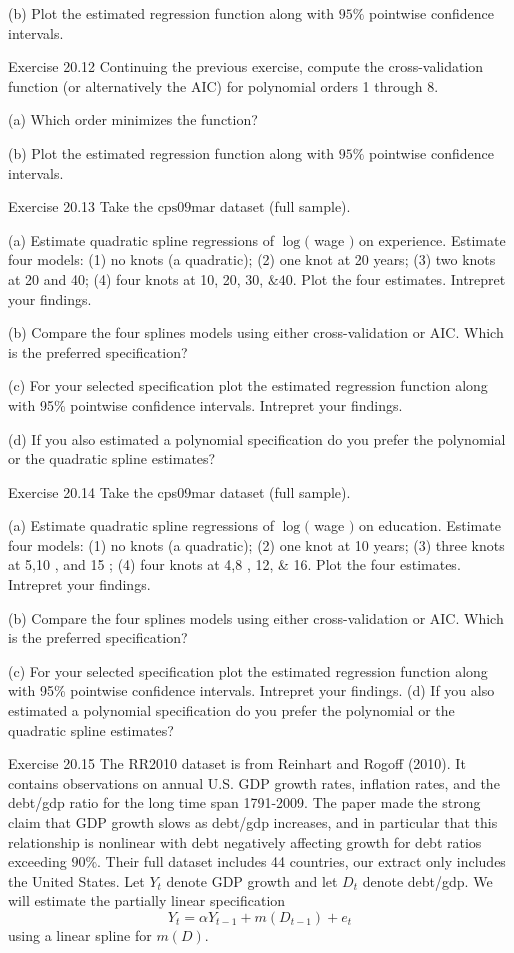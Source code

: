 \documentclass[10pt]{article}
\begin{document}
(b) Plot the estimated regression function along with $95 \%$ pointwise confidence intervals.

Exercise 20.12 Continuing the previous exercise, compute the cross-validation function (or alternatively the AIC) for polynomial orders 1 through 8.

(a) Which order minimizes the function?

(b) Plot the estimated regression function along with $95 \%$ pointwise confidence intervals.

Exercise 20.13 Take the $\mathrm{cps} 09 \mathrm{mar}$ dataset (full sample).

(a) Estimate quadratic spline regressions of $\log ($ wage $)$ on experience. Estimate four models: (1) no knots (a quadratic); (2) one knot at 20 years; (3) two knots at 20 and 40; (4) four knots at 10, 20, 30, $\& 40$. Plot the four estimates. Intrepret your findings.

(b) Compare the four splines models using either cross-validation or AIC. Which is the preferred specification?

(c) For your selected specification plot the estimated regression function along with 95\% pointwise confidence intervals. Intrepret your findings.

(d) If you also estimated a polynomial specification do you prefer the polynomial or the quadratic spline estimates?

Exercise 20.14 Take the cps09mar dataset (full sample).

(a) Estimate quadratic spline regressions of $\log ($ wage $)$ on education. Estimate four models: (1) no knots (a quadratic); (2) one knot at 10 years; (3) three knots at 5,10 , and 15 ; (4) four knots at 4,8 , 12, \& 16. Plot the four estimates. Intrepret your findings.

(b) Compare the four splines models using either cross-validation or AIC. Which is the preferred specification?

(c) For your selected specification plot the estimated regression function along with 95\% pointwise confidence intervals. Intrepret your findings. (d) If you also estimated a polynomial specification do you prefer the polynomial or the quadratic spline estimates?

Exercise 20.15 The RR2010 dataset is from Reinhart and Rogoff (2010). It contains observations on annual U.S. GDP growth rates, inflation rates, and the debt/gdp ratio for the long time span 1791-2009. The paper made the strong claim that GDP growth slows as debt/gdp increases, and in particular that this relationship is nonlinear with debt negatively affecting growth for debt ratios exceeding $90 \%$. Their full dataset includes 44 countries, our extract only includes the United States. Let $Y_{t}$ denote GDP growth and let $D_{t}$ denote debt/gdp. We will estimate the partially linear specification
$$
Y_{t}=\alpha Y_{t-1}+m\left(D_{t-1}\right)+e_{t}
$$
using a linear spline for $m(D)$.
\end{document}
